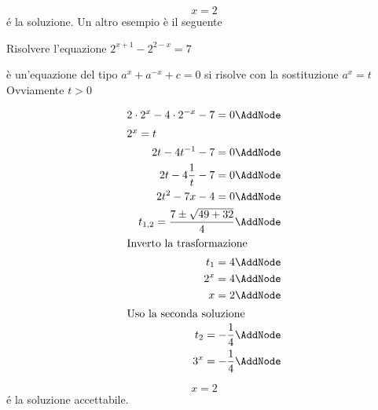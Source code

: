 	\[x=2\]
	\'{e} la soluzione.
Un altro esempio è il seguente
\begin{esempiot}{}{}
	Risolvere l'equazione $ 2^{x+1}-2^{2-x}=7$ 
\end{esempiot}
	è un'equazione del tipo $a^{x}+a^{-x}+c=0$ si risolve con la sostituzione $a^{x}=t$
	Ovviamente $t>0$ 
	\begin{NodesList} [margin=4cm]
		\begin{align*}
			 2\cdot 2^{x}-4\cdot 2^{-x}-7=0\AddNode\\
			 \intertext{\hfil $2^x=t$}
			2t-4t^{-1}-7=0\AddNode\\
			2t-4\dfrac{1}{t}-7=0\AddNode\\
			2t^2-7x-4=0\AddNode\\
			t_{1,2}=\dfrac{7\pm\sqrt{49+32}}{4}\AddNode\\
			\intertext{\hfil Inverto la trasformazione}
			t_{1}=4\AddNode\\
			2^{x}=4\AddNode\\
			x=2\AddNode\\
			\intertext{\hfil Uso la seconda soluzione}
			t_{2}=-\dfrac{1}{4} \AddNode\\
			3^x=-\dfrac{1}{4}\AddNode
		\end{align*}
		\LinkNodes{}%
	\end{NodesList}
	\[x=2\]
	\'{e} la soluzione accettabile.
